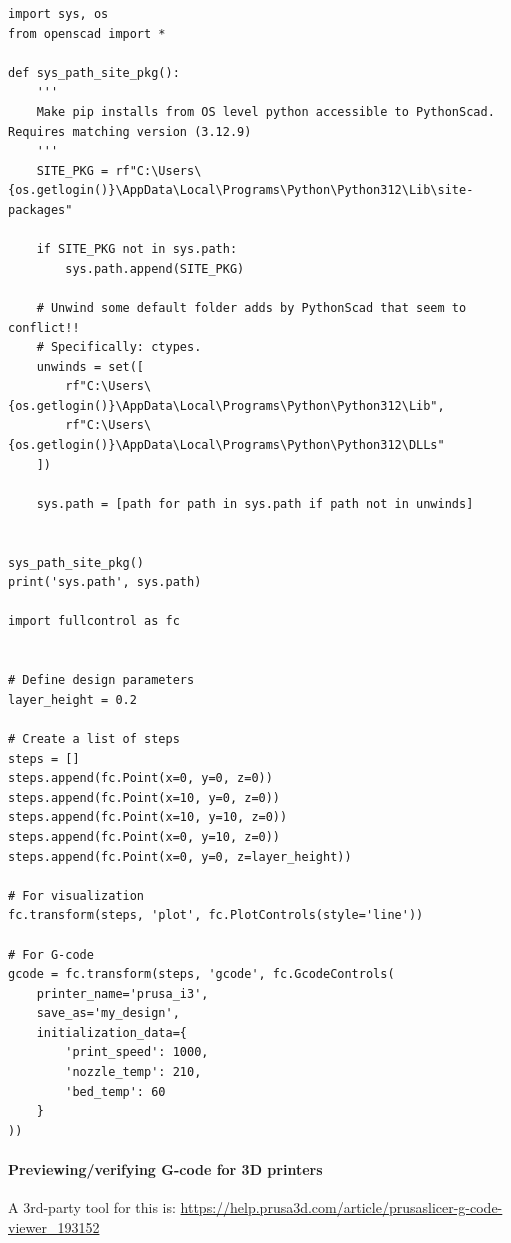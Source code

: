 \documentclass{ltxdoc}
\begin{document}
\begin{verbatim}
import sys, os
from openscad import *
 
def sys_path_site_pkg():
    '''
    Make pip installs from OS level python accessible to PythonScad. Requires matching version (3.12.9)
    '''
    SITE_PKG = rf"C:\Users\{os.getlogin()}\AppData\Local\Programs\Python\Python312\Lib\site-packages"
 
    if SITE_PKG not in sys.path:
        sys.path.append(SITE_PKG)
 
    # Unwind some default folder adds by PythonScad that seem to conflict!!
    # Specifically: ctypes.
    unwinds = set([
        rf"C:\Users\{os.getlogin()}\AppData\Local\Programs\Python\Python312\Lib", 
        rf"C:\Users\{os.getlogin()}\AppData\Local\Programs\Python\Python312\DLLs"
    ])
 
    sys.path = [path for path in sys.path if path not in unwinds]
 
 
sys_path_site_pkg()
print('sys.path', sys.path)
 
import fullcontrol as fc
 
 
# Define design parameters
layer_height = 0.2
 
# Create a list of steps
steps = []
steps.append(fc.Point(x=0, y=0, z=0))
steps.append(fc.Point(x=10, y=0, z=0))
steps.append(fc.Point(x=10, y=10, z=0))
steps.append(fc.Point(x=0, y=10, z=0))
steps.append(fc.Point(x=0, y=0, z=layer_height))
 
# For visualization
fc.transform(steps, 'plot', fc.PlotControls(style='line'))
 
# For G-code
gcode = fc.transform(steps, 'gcode', fc.GcodeControls(
    printer_name='prusa_i3',
    save_as='my_design',
    initialization_data={
        'print_speed': 1000,
        'nozzle_temp': 210,
        'bed_temp': 60
    }
)) 

\end{verbatim}

\paragraph{Previewing/verifying G-code for 3D printers}

A 3rd-party tool for this is: \url{https://help.prusa3d.com/article/prusaslicer-g-code-viewer_193152}
\end{document}
